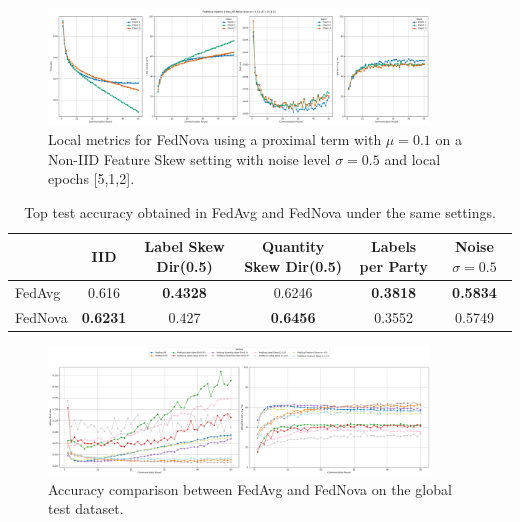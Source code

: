 \begin{figure}[H]
  \centering
  \includegraphics[width=0.9\textwidth]{figures/2-Federated_Learning/FedNova_Noise_LE_512.png}
  \caption{Local metrics for FedNova using a proximal term with $\mu=0.1$ on a Non-IID Feature Skew setting with noise level $\sigma=0.5$ and local epochs [5,1,2].}
  \label{fig:FedNova_Noise_LE_512}
\end{figure}

\begin{table}[h]
    \centering
    \begin{adjustbox}{max width=\textwidth}
    \begin{tabular}{lccccc}
        \toprule
        & IID & Label Skew Dir(0.5) & Quantity Skew Dir(0.5) & Labels per Party & Noise $\sigma=0.5$ \\
        \midrule
        FedAvg & 0.616 & \textbf{0.4328} & 0.6246 & \textbf{0.3818} & \textbf{0.5834} \\
        FedNova & \textbf{0.6231} & 0.427 & \textbf{0.6456} & 0.3552 & 0.5749 \\
        \bottomrule
    \end{tabular}
    \end{adjustbox}
    \caption{Top test accuracy obtained in FedAvg and FedNova under the same settings.}
    \label{tab:fed_comparison}
\end{table}

\begin{figure}[H]
  \centering
  \includegraphics[width=0.9\textwidth]{figures/2-Federated_Learning/Global_Metrics_FedNova.png}
  \caption{Accuracy comparison between FedAvg and FedNova on the global test dataset.}
  \label{fig:FedNova_Global_Metrics}
\end{figure}


